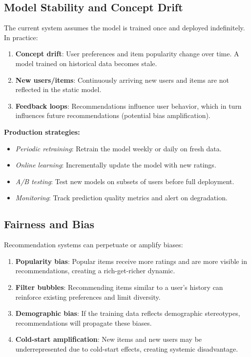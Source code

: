 \subsection{Model Stability and Concept Drift}

The current system assumes the model is trained once and deployed indefinitely. In practice:

\begin{enumerate}
  \item \textbf{Concept drift}: User preferences and item popularity change over time. A model trained 
  on historical data becomes stale.
  
  \item \textbf{New users/items}: Continuously arriving new users and items are not reflected in the 
  static model.
  
  \item \textbf{Feedback loops}: Recommendations influence user behavior, which in turn influences 
  future recommendations (potential bias amplification).
\end{enumerate}

\textbf{Production strategies:}
\begin{itemize}
  \item \textit{Periodic retraining}: Retrain the model weekly or daily on fresh data.
  
  \item \textit{Online learning}: Incrementally update the model with new ratings.
  
  \item \textit{A/B testing}: Test new models on subsets of users before full deployment.
  
  \item \textit{Monitoring}: Track prediction quality metrics and alert on degradation.
\end{itemize}

\subsection{Fairness and Bias}

Recommendation systems can perpetuate or amplify biases:

\begin{enumerate}
  \item \textbf{Popularity bias}: Popular items receive more ratings and are more visible in recommendations, 
  creating a rich-get-richer dynamic.
  
  \item \textbf{Filter bubbles}: Recommending items similar to a user's history can reinforce existing 
  preferences and limit diversity.
  
  \item \textbf{Demographic bias}: If the training data reflects demographic stereotypes, recommendations 
  will propagate these biases.
  
  \item \textbf{Cold-start amplification}: New items and new users may be underrepresented due to cold-start 
  effects, creating systemic disadvantage.
\end{enumerate}

